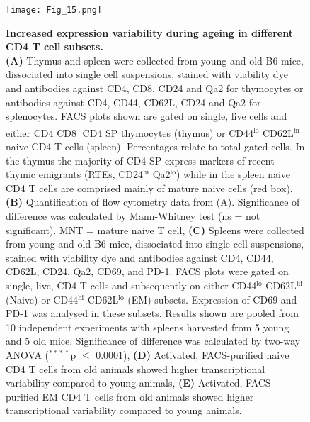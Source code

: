 \begin{figure}[!ht]
\centering
\texttt{[image: Fig\_15.png]}
\caption[Increased expression variability during ageing in different CD4\plus{} T cell subsets]{\textbf{Increased expression variability during ageing in different CD4\plus{} T cell subsets.} \\
\textbf{(A)} Thymus and spleen were collected from young and old B6 mice, dissociated into single cell suspensions, stained with viability dye and antibodies against CD4, CD8, CD24 and Qa2 for thymocytes or antibodies against CD4, CD44, CD62L, CD24 and Qa2 for splenocytes. FACS plots shown are gated on single, live cells and either CD4\plus{} CD8\textsuperscript{-} CD4 \gls{SP} thymocytes (thymus) or CD44$^\text{lo}$ CD62L$^\text{hi}$ naive CD4\plus{} T cells (spleen). 
Percentages relate to total gated cells. In the thymus the majority of CD4 SP express markers of recent thymic emigrants (RTEs, CD24$^\text{hi}$ Qa2$^\text{lo}$) while in the spleen naive CD4\plus{} T cells are comprised mainly of mature naive cells (red box), 
\textbf{(B)} Quantification of flow cytometry data from (A). Significance of difference was calculated by Mann-Whitney test (ns = not significant). 
MNT = mature naive T cell, 
\textbf{(C)} Spleens were collected from young and old B6 mice, dissociated into single cell suspensions, stained with viability dye and antibodies against CD4, CD44, CD62L, CD24, Qa2, CD69, and PD-1. 
FACS plots were gated on single, live, CD4\plus{} T cells and subsequently on either CD44$^\text{lo}$ CD62L$^\text{hi}$ (Naive) or CD44$^\text{hi}$ CD62L$^\text{lo}$ (EM) subsets. 
Expression of CD69 and PD-1 was analysed in these subsets. Results shown are pooled from 10 independent experiments with spleens harvested from 5 young and 5 old mice. 
Significance of difference was calculated by two-way ANOVA ($^{\ast{}\ast{}\ast{}\ast}$p $\leq$ 0.0001), 
\textbf{(D)} Activated, FACS-purified naive CD4\plus{} T cells from old animals showed higher transcriptional variability compared to young animals, 
\textbf{(E)} Activated, FACS-purified EM CD4\plus{} T cells from old animals showed higher transcriptional variability compared to young animals.}
\label{fig1:EM_Naive_CD4}
\end{figure}

